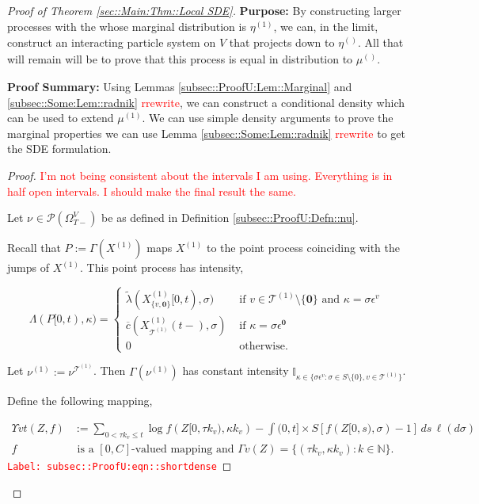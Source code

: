 \documentclass[12pt]{article}
\newcommand{\mb}{\mathbb}
\newcommand{\mc}{\mathcal}
\newcommand{\ov}{\overline}
\newcommand{\te}{\text}
\newcommand{\ep}{\epsilon}
\newcommand{\tr}{\textcolor{red}}
\newcommand{\labe}[1]{\tr{\texttt{Label: #1}}}
\newcommand{\purpose}{\textbf{Purpose: }}
\newcommand{\pfsum}{\textbf{Proof Summary: }}
\newcommand{\ind}{\hspace{24pt}}
\newcommand{\defeq}{:=}								%
\newcommand{\pmsr}{\mc{P}}							%
\renewcommand{\root}{\mathbf{0}}				%
\renewcommand{\v}{v}							%
\renewcommand{\S}{S}							%
\newcommand{\s}{\sigma}							%
\newcommand{\ev}{\ep}							%
\newcommand{\T}{T}								%
\renewcommand{\t}{t}							%
\newcommand{\sset}{\Omega}						%
\renewcommand{\tt}{s}							%
\newcommand{\X}{X}								%
\newcommand{\vind}[1]{^{#1}}					%
\newcommand{\vsi}[1]{^{#1}}						%
\newcommand{\cind}[1]{_{#1}}					%
\newcommand{\tp}[1]{(#1)}						%
\newcommand{\tip}[1]{#1}						%
\newcommand{\ts}[1]{_{#1}}						%
\newcommand{\const}{C}							%
\newcommand{\IGrg}{\ov{c}}						%
\newcommand{\tree}{\mc{T}}						%
\newcommand{\sln}[1]{^{(#1)}}						%
\newcommand{\Sm}{\ell}							%
\newcommand{\alt}[1]{\widetilde{#1}}			%
\newcommand{\indx}[1]{_{#1}}					%
\newcommand{\m}{\mu}							%
\newcommand{\mm}{\nu}							%
\newcommand{\mmm}{\eta}							%
\newcommand{\XXX}{Z}							%
\newcommand{\rt}{\tau}							%
\renewcommand{\it}{k}							%
\newcommand{\pmap}{\Gamma}						%
\renewcommand{\mark}{\kappa}					%
\newcommand{\rp}{P}								%
\newcommand{\ratee}{\Lambda}					%
\newcommand{\crate}{\alt{\lambda}}				%
\newcommand{\ds}{\Upsilon}						%
\begin{document}
\begin{proof}[Proof of Theorem \ref{sec::Main:Thm::Local SDE}]
\purpose By constructing larger processes with the whose marginal distribution is \(\mmm\sln{1}\ts{}\), we can, in the limit, construct an interacting particle system on \(V\) that projects down to \(\mmm\sln{}\ts{}\). All that will remain will be to prove that this process is equal in distribution to \(\m\sln{}\ts{}\).

\pfsum Using Lemmas \ref{subsec::ProofU:Lem::Marginal} and \ref{subsec::Some:Lem::radnik} \tr{rrewrite}, we can construct a conditional density which can be used to extend \(\mu\sln{1}\). We can use simple density arguments to prove the marginal properties we can use Lemma \ref{subsec::Some:Lem::radnik} \tr{rrewrite} to get the SDE formulation.

\begin{proof}
\tr{I'm not being consistent about the intervals I am using. Everything is in half open intervals. I should make the final result the same.}

Let \(\mm\vind{}\ts{} \in \pmsr(\sset\vsi{V}\ts{\T-})\) be as defined in Definition \ref{subsec::ProofU:Defn::nu}.

\ind Recall that \(\rp{} \defeq \pmap{}(\X\sln{1}\cind{}\tip{})\) maps \(\X\sln{1}\cind{}\tip{}\) to the point process coinciding with the jumps of \(\X\sln{1}\cind{}\tip{}\). This point process has intensity,

\[\ratee{}(\rp{}[0,\t),\mark{}) = \begin{cases}
\crate{}{}(\X\sln{1}\cind{\{\v,\root\}}\tip{[0,\t)},\s) &\te{ if } \v\in \tree\sln{1}\setminus\{\root\}\te{ and } \mark{} = \s\ev\vind{\v}\\
\IGrg{}(\X\sln{1}\cind{\tree\sln{1}}\tp{\t-},\s) &\te{ if } \mark{} = \s\ev\vind{\root}\\
0 &\te{ otherwise}.
\end{cases}\]

Let \(\mm\sln{1}\ts{} \defeq \mm\vind{\tree\sln{1}}\ts{}\). Then \(\pmap{}(\mm\sln{1}\ts{})\) has constant intensity \(\mb{I}_{\kappa \in\{\s\ev\vind{\v}:\s\in\S\setminus\{0\},\v\in\tree\sln{1}\}}\). 

\ind Define the following mapping,

\begin{align}
\ds{\v}{\t}(\XXX{}{},f) &\defeq \sum_{0 < \rt{\it}_\v \leq \t} \log{f(\XXX{}{[0,\rt{\it}_\v)},\mark{\it}_\v)} - \int{(0,\t]\times \S} [f(\XXX{}{[0,\tt)},\s) - 1]\,ds\,\Sm(d\s) \label{subsec::ProofU:eqn::shortdense}\\
f&\te{ is a }[0,\const\indx{}] \te{-valued mapping and } \pmap{\v}(\XXX{}{}) = \{(\rt{\it}_\v,\mark{\it}_\v):\it\in\mb{N}\}.\nonumber
\end{align} 
\labe{subsec::ProofU:eqn::shortdense}


\end{proof}
\end{proof}
\end{document}
